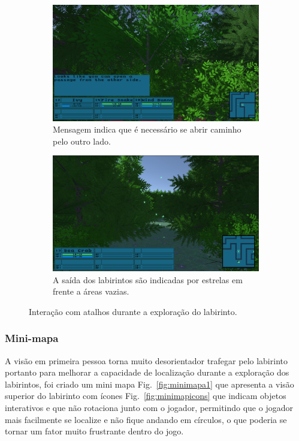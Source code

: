 \documentclass[
	12pt,				%
	openright,			%
	twoside,			%
	a4paper,			%
	english,			%
	french,				%
	spanish,			%
	brazil				%
	]{abntex2}
\begin{document}
\begin{figure}[h!]
\begin{subfigure}[b]{0.47\linewidth}
    \includegraphics[width=\linewidth]{warning.jpg}
    \caption{Mensagem indica que é necessário se abrir caminho pelo outro lado.}
  \end{subfigure}
  \begin{subfigure}[b]{0.47\linewidth}
    \includegraphics[width=\linewidth]{exit.jpg}
    \caption{A saída dos labirintos são indicadas por estrelas em frente a áreas vazias.}
  \end{subfigure}
  \caption{Interação com atalhos durante a exploração do labirinto.}
  \label{fig:shortcut}
\end{figure}
\pagebreak
\subsubsection{Mini-mapa}

A visão em primeira pessoa torna muito desorientador trafegar pelo labirinto portanto para melhorar a capacidade de localização durante a exploração dos labirintos, foi criado um mini mapa Fig.~\ref{fig:minimapa1} que apresenta a visão superior do labirinto com ícones Fig.~\ref{fig:minimapicons} que indicam objetos interativos e que não rotaciona junto com o jogador, permitindo que o jogador mais facilmente se localize e não fique andando em círculos, o que poderia se tornar um fator muito frustrante dentro do jogo.
\end{document}
